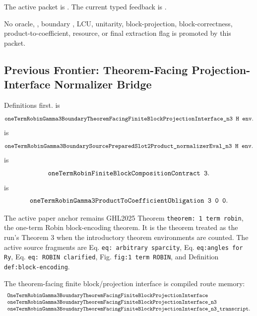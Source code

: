 The active packet is
.
The current typed feedback is
.

No oracle, , boundary , LCU, unitarity,
block-projection, block-correctness, product-to-coefficient, resource, or final
extraction flag is promoted by this packet.

\subsection{Previous Frontier: Theorem-Facing Projection-Interface Normalizer Bridge}

Definitions first.   is
\[
  \Lean{oneTermRobinGamma3BoundaryTheoremFacingFiniteBlockProjectionInterface\_n3\ H\ env}.
\]
 is
\[
  \Lean{oneTermRobinGamma3BoundarySourcePreparedSlot2Product\_normalizerEval\_n3\ H\ env}.
\]
 is
\[
  \Lean{oneTermRobinFiniteBlockCompositionContract\ 3}.
\]
 is
\[
  \Lean{oneTermRobinGamma3ProductToCoefficientObligation\ 3\ 0\ 0}.
\]

The active paper anchor remains GHL2025 Theorem
\texttt{theorem: 1 term robin}, the one-term Robin block-encoding theorem.
It is the theorem treated as the run's Theorem 3 when the introductory theorem
environments are counted.  The active source fragments are Eq.
\texttt{eq: arbitrary sparcity}, Eq. \texttt{eq:angles for Ry}, Eq.
\texttt{eq: ROBIN clarified}, Fig. \texttt{fig:1 term ROBIN}, and Definition
\texttt{def:block-encoding}.

The theorem-facing finite block/projection interface is compiled route memory:
\[
\begin{array}{l}
\texttt{OneTermRobinGamma3BoundaryTheoremFacingFiniteBlockProjectionInterface}\\
\texttt{oneTermRobinGamma3BoundaryTheoremFacingFiniteBlockProjectionInterface\_n3}\\
\texttt{oneTermRobinGamma3BoundaryTheoremFacingFiniteBlockProjectionInterface\_n3\_transcript}.
\end{array}
\]

